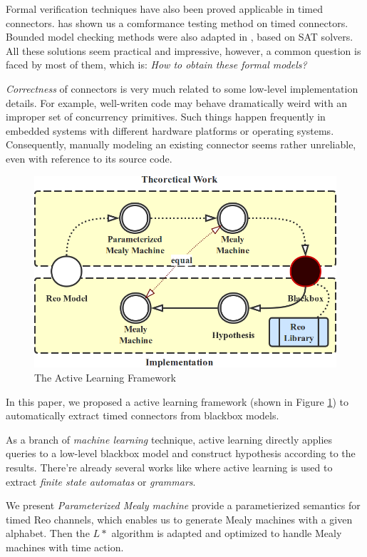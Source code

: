 \documentclass[conference, a4paper]{IEEEtran}
\begin{document}
Formal verification techniques have also been proved applicable in timed connectors.
\cite{DBLP:conf/tase/LiCWS15} has shown us a comformance testing method on timed connectors.
Bounded model checking methods were also adapted in \cite{DBLP:journals/scp/Kemper12}, based on SAT
solvers. All these solutions seem practical and impressive, however, a common question is faced by
most of them, which is: \emph{How to obtain these formal models?}

\emph{Correctness} of connectors is very much related to some low-level implementation details.
For example, well-writen code may behave dramatically weird with an improper set of concurrency
primitives. Such things happen frequently in embedded systems with different hardware platforms or
operating systems. Consequently, manually modeling an existing connector seems rather unreliable,
even with reference to its source code.

\begin{figure}[h]
  \begin{center}
    \includegraphics[width=.4\textwidth]{./images/howto.png}
  \end{center}
  \caption{The Active Learning Framework}
  \label{fig:howto}
\end{figure}




In this paper, we proposed a active learning framework (shown in Figure \ref{fig:howto}) to
automatically extract timed connectors from blackbox models. 

As a branch of \emph{machine learning} technique, active learning directly applies queries to a
low-level blackbox model and construct hypothesis according to the results.
There're already several works like \cite{DBLP:journals/mt/Daelemans10,
DBLP:journals/iandc/Angluin87, DBLP:conf/fase/RaffeltS06} where active learning is used to extract
\emph{finite state automatas} or \emph{grammars}.

We present \emph{Parameterized Mealy machine} provide a parametierized semantics for timed Reo
channels, which enables us to generate Mealy machines with a given alphabet. Then the $L*$ algorithm
is adapted and optimized to handle Mealy machines with time action.
\end{document}
